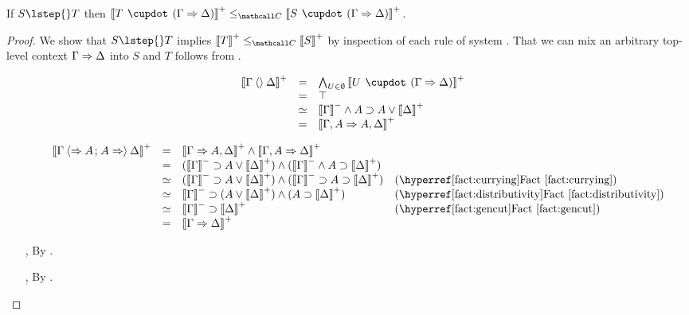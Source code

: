 \begin{lemma}
  
  If $S \lstep{} T$ then $\psint{T \mix (\Gamma \seq \Delta)} \sementC \psint{S
  \mix (\Gamma \seq \Delta)}$.
\end{lemma}
\begin{proof}
  We show that $S \lstep{} T$ implies $\psint{T} \sementC \psint{S}$ by inspection
  of each rule of system . That we can mix an arbitrary top-level context
  $\Gamma \Rightarrow \Delta$ into $S$ and $T$ follows from .

  \def\arraystretch{1.25}
  \begin{itemize}
    \item[\rsf{i{\da}}]
    $$
    \begin{array}{rcll}
      \psint{\Gamma \piq{} \Delta}
      &=& \bigwedge_{U \in \emptyset}{\psint{U \mix (\Gamma \seq \Delta)}} &\\
      &=& \top & \\
      &\semequiv& \nsint{\Gamma} \wedge A \limp A \lor \psint{\Delta} &\\
      &=& \psint{\Gamma, A \seq A, \Delta}
    \end{array}
    $$
    \item[\rsf{i{\ua}}]
    $$
    \begin{array}{rcll}
      \psint{\Gamma \piq{\seq A \sep A \seq} \Delta}
      &=& \psint{\Gamma \seq A, \Delta} \wedge \psint{\Gamma, A \seq \Delta} & \\
      &=& (\nsint{\Gamma} \limp A \lor \psint{\Delta}) \land (\nsint{\Gamma} \land A \limp \psint{\Delta}) & \\
      &\semequiv& (\nsint{\Gamma} \limp A \lor \psint{\Delta}) \wedge (\nsint{\Gamma} \limp A \limp \psint{\Delta}) &\text{(\reffact{currying})}\\
      &\semequiv& \nsint{\Gamma} \limp (A \lor \psint{\Delta}) \wedge (A \limp \psint{\Delta}) &\text{(\reffact{distributivity})}\\
      &\semequiv& \nsint{\Gamma} \limp \psint{\Delta} &\text{(\reffact{gencut})}\\
      &=& \psint{\Gamma \seq \Delta} & \\
    \end{array}
    $$
    \item[{\rsf{w{-}}}, {\rsf{w{+}}}] By .
    \item[{\rsf{c{-}}}, {\rsf{c{+}}}] By .


\end{itemize}
\end{proof}
